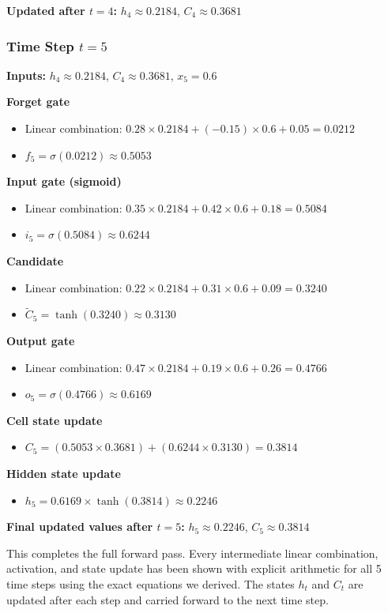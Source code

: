 \documentclass[12pt]{article}
\begin{document}
\textbf{Updated after $t=4$:} $h_4 \approx 0.2184$, $C_4 \approx 0.3681$

\subsubsection*{Time Step $t = 5$}

\textbf{Inputs:} $h_4 \approx 0.2184$, $C_4 \approx 0.3681$, $x_5 = 0.6$

\textcolor{headingRed}{\textbf{Forget gate}}
\begin{itemize}[leftmargin=*]
    \item Linear combination: $0.28 \times 0.2184 + (-0.15) \times 0.6 + 0.05 = 0.0212$
    \item $f_5 = \sigma(0.0212) \approx 0.5053$
\end{itemize}

\textcolor{headingRed}{\textbf{Input gate (sigmoid)}}
\begin{itemize}[leftmargin=*]
    \item Linear combination: $0.35 \times 0.2184 + 0.42 \times 0.6 + 0.18 = 0.5084$
    \item $i_5 = \sigma(0.5084) \approx 0.6244$
\end{itemize}

\textcolor{headingRed}{\textbf{Candidate}}
\begin{itemize}[leftmargin=*]
    \item Linear combination: $0.22 \times 0.2184 + 0.31 \times 0.6 + 0.09 = 0.3240$
    \item $\tilde{C}_5 = \tanh(0.3240) \approx 0.3130$
\end{itemize}

\textcolor{headingRed}{\textbf{Output gate}}
\begin{itemize}[leftmargin=*]
    \item Linear combination: $0.47 \times 0.2184 + 0.19 \times 0.6 + 0.26 = 0.4766$
    \item $o_5 = \sigma(0.4766) \approx 0.6169$
\end{itemize}

\textcolor{headingRed}{\textbf{Cell state update}}
\begin{itemize}[leftmargin=*]
    \item $C_5 = (0.5053 \times 0.3681) + (0.6244 \times 0.3130) = 0.3814$
\end{itemize}

\textcolor{headingRed}{\textbf{Hidden state update}}
\begin{itemize}[leftmargin=*]
    \item $h_5 = 0.6169 \times \tanh(0.3814) \approx 0.2246$
\end{itemize}

\textbf{Final updated values after $t=5$:} $h_5 \approx 0.2246$, $C_5 \approx 0.3814$

This completes the full forward pass. Every intermediate linear combination, activation, and state update has been shown with explicit arithmetic for all 5 time steps using the exact equations we derived. The states $h_t$ and $C_t$ are updated after each step and carried forward to the next time step.
\end{document}
